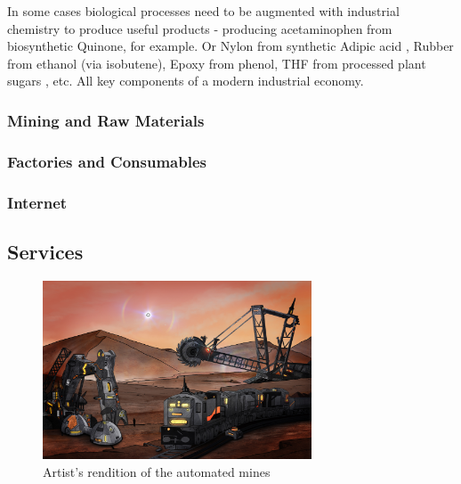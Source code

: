 \documentclass[fleqn,10pt]{Stylesheet} %
\begin{document}
In some cases biological processes need to be augmented with industrial chemistry to produce useful products - producing acetaminophen from biosynthetic Quinone, for example. Or Nylon from synthetic Adipic acid \cite{WeiNiu2002}, Rubber from ethanol \cite{JunmingSun2011} (via isobutene), Epoxy from phenol, THF from processed plant sugars \cite{ShuoChen2018}, etc. All key components of a modern industrial economy.


\subsubsection{Mining and Raw Materials}
\label{sec:necessities_raw}

\subsubsection{Factories and Consumables}
\label{sec:necessities_consumable}

\subsubsection{Internet}
\label{sec:necessities_internet}

\subsection{Services}


\begin{figure}
    \centering
    \includegraphics[width=80mm]{art/mining.jpg}
    \caption{Artist's rendition of the automated mines}
    \label{fig:mines}
\end{figure}
\end{document}
